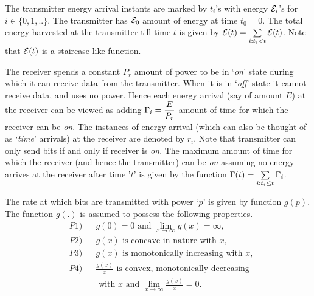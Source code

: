 The transmitter energy arrival instants are marked by $t_i$'s with energy $\mathcal{E}_i$'s for $i \in \{0,1,..\}$. The transmitter has $\mathcal{E}_0$ amount of energy at time $t_0=0$. The total energy harvested at the transmitter till time $t$ is given by $\mathcal{E}(t)=\sum\limits_{i:t_i < t}\mathcal{E}(t)$. Note that $\mathcal{E}(t)$ is a staircase like function.
 
The receiver spends a constant $P_{r}$ amount of power to be in `\textit{on}' state during which it can receive data from the transmitter. When it is in `\textit{off}' state it cannot receive data, and uses no power. Hence each energy arrival (say of amount $E$) at the receiver can be viewed as adding $\Gamma_i=\dfrac{E}{P_{r}}$ amount of time for which the receiver can be \textit{on}. The instances of energy arrival (which can also be thought of as `\textit{time}' arrivals) at the receiver are denoted by $r_i$. Note that transmitter can only send bits if and only if receiver is \textit{on}. The maximum amount of time for which the receiver (and hence the transmitter) can be \textit{on} assuming no energy arrives at the receiver after time '$t$' is given by the function $\Gamma(t)=\sum\limits_{i:t_i\leq t} \Gamma_i$.

The rate at which bits are transmitted with power `$p$' is given by function $g(p)$. The function $g(.)$ is assumed to possess the following properties. 
\begin{align}
&P1) &&g(0)=0\text{ and }\lim_{x\rightarrow \infty} g(x)= \infty,\label{property_0_infty}
\\
&P2) &&g(x)\text{ is concave in nature with } x,\label{property_concave}
\\
&P3) &&g(x)\text{ is monotonically increasing with } x,\label{property_increasing}
\\ 
&P4) &&\frac{g(x)}{x} \text{ is convex, monotonically decreasing} \nonumber
\\
&    &&\text{ with } x \text{ and } \lim_{x\rightarrow \infty} \frac{g(x)}{x}= 0.\label{property_decreasing}
\end{align}


